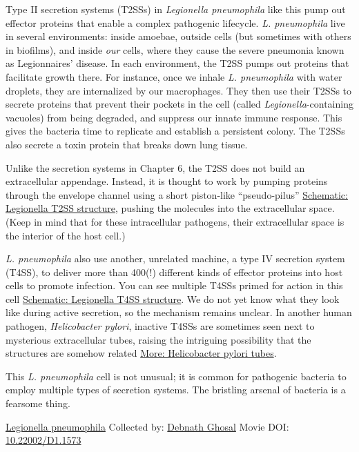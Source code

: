 \documentclass[]{tufte-book}
\begin{document}
Type II secretion systems (T2SSs) in \emph{Legionella pneumophila} like this pump out effector proteins that enable a complex pathogenic lifecycle. \emph{L. pneumophila} live in several environments: inside amoebae, outside cells (but sometimes with others in biofilms), and inside \emph{our} cells, where they cause the severe pneumonia known as Legionnaires' disease. In each environment, the T2SS pumps out proteins that facilitate growth there. For instance, once we inhale \emph{L. pneumophila} with water droplets, they are internalized by our macrophages. They then use their T2SSs to secrete proteins that prevent their pockets in the cell (called \emph{Legionella}-containing vacuoles) from being degraded, and suppress our innate immune response. This gives the bacteria time to replicate and establish a persistent colony. The T2SSs also secrete a toxin protein that breaks down lung tissue.

Unlike the secretion systems in Chapter 6, the T2SS does not build an extracellular appendage. Instead, it is thought to work by pumping proteins through the envelope channel using a short piston-like ``pseudo-pilus'' \protect\hyperlink{Legionella_T2SS_structure}{Schematic: Legionella T2SS structure}, pushing the molecules into the extracellular space. (Keep in mind that for these intracellular pathogens, their extracellular space is the interior of the host cell.)

\emph{L. pneumophila} also use another, unrelated machine, a type IV secretion system (T4SS), to deliver more than 400(!) different kinds of effector proteins into host cells to promote infection. You can see multiple T4SSs primed for action in this cell \protect\hyperlink{Legionella_T4SS_structure}{Schematic: Legionella T4SS structure}. We do not yet know what they look like during active secretion, so the mechanism remains unclear. In another human pathogen, \emph{Helicobacter pylori}, inactive T4SSs are sometimes seen next to mysterious extracellular tubes, raising the intriguing possibility that the structures are somehow related \protect\hyperlink{Helicobacter_pylori_tubes}{More: Helicobacter pylori tubes}.

This \emph{L. pneumophila} cell is not unusual; it is common for pathogenic bacteria to employ multiple types of secretion systems. The bristling arsenal of bacteria is a fearsome thing.



\hypertarget{htmlwidget-d81906aee80d4886ca87}{}

\label{fig:9-3}\protect\hyperlink{tree}{Legionella pneumophila} Collected by: \protect\hyperlink{debnath_ghosal}{Debnath Ghosal} Movie DOI: \href{https://doi.org/10.22002/D1.1573}{10.22002/D1.1573}
\end{document}
